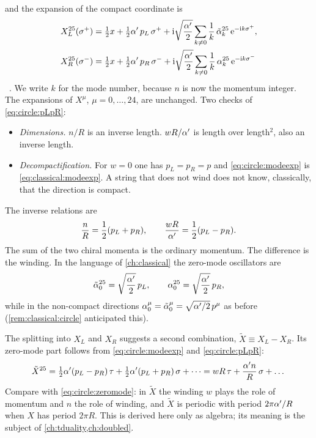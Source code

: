 and the expansion of the compact coordinate is
\begin{align}
 X_L^{25}(\sigma^+)&=\tfrac12x+\tfrac12\alpha'\,p_L\,\sigma^+
   +\mathrm{i}\sqrt{\frac{\alpha'}2}\sum_{k\neq0}\frac1k\,\tilde\alpha_k^{25}\,\mathrm{e}^{-\mathrm{i} k\sigma^+},\nonumber\\
 X_R^{25}(\sigma^-)&=\tfrac12x+\tfrac12\alpha'\,p_R\,\sigma^-
   +\mathrm{i}\sqrt{\frac{\alpha'}2}\sum_{k\neq0}\frac1k\,\alpha_k^{25}\,\mathrm{e}^{-\mathrm{i} k\sigma^-}
   \label{eq:circle:modeexp}
\end{align}
\TL\ . We write $k$ for the mode number,
because $n$ is now the momentum integer. The expansions of $X^\mu$, $\mu=0,\dots,24$, are
unchanged. Two checks of \eqref{eq:circle:pLpR}:
\begin{itemize}[leftmargin=*]
\item \emph{Dimensions.} $n/R$ is an inverse length. $wR/\alpha'$ is length over length$^2$, also
an inverse length.
\item \emph{Decompactification.} For $w=0$ one has $p_L=p_R=p$ and
\eqref{eq:circle:modeexp} is \cref{eq:classical:modeexp}. A string that does not wind does not
know, classically, that the direction is compact.
\end{itemize}
The inverse relations are
\begin{equation}\label{eq:circle:inverse}
 \frac nR=\frac12(p_L+p_R),\qquad \frac{wR}{\alpha'}=\frac12(p_L-p_R).
\end{equation}
The sum of the two chiral momenta is the ordinary momentum. The difference is the winding.
In the language of \cref{ch:classical} the zero-mode oscillators are
\begin{equation}\label{eq:circle:alpha0}
 \tilde\alpha_0^{25}=\sqrt{\frac{\alpha'}2}\,p_L,\qquad \alpha_0^{25}=\sqrt{\frac{\alpha'}2}\,p_R ,
\end{equation}
while in the non-compact directions
$\alpha_0^\mu=\tilde\alpha_0^\mu=\sqrt{\alpha'/2}\,p^\mu$ as before
(\cref{rem:classical:circle} anticipated this).

\begin{remark}\label{rem:circle:dualcoord}
The splitting into $X_L$ and $X_R$ suggests a second combination,
$\tilde X\equiv X_L-X_R$. Its zero-mode part follows from
\eqref{eq:circle:modeexp} and \eqref{eq:circle:pLpR}:
\[
 \tilde X^{25}=\tfrac12\alpha'(p_L-p_R)\,\tau+\tfrac12\alpha'(p_L+p_R)\,\sigma+\dots
 =wR\,\tau+\frac{\alpha' n}{R}\,\sigma+\dots
\]
Compare with \eqref{eq:circle:zeromode}: in $\tilde X$ the winding $w$ plays the role of
momentum and $n$ the role of winding, and $\tilde X$ is periodic with period
$2\pi\alpha'/R$ when $X$ has period $2\pi R$. This is derived here only as algebra; its meaning is
the subject of \cref{ch:tduality,ch:doubled}.
\end{remark}

